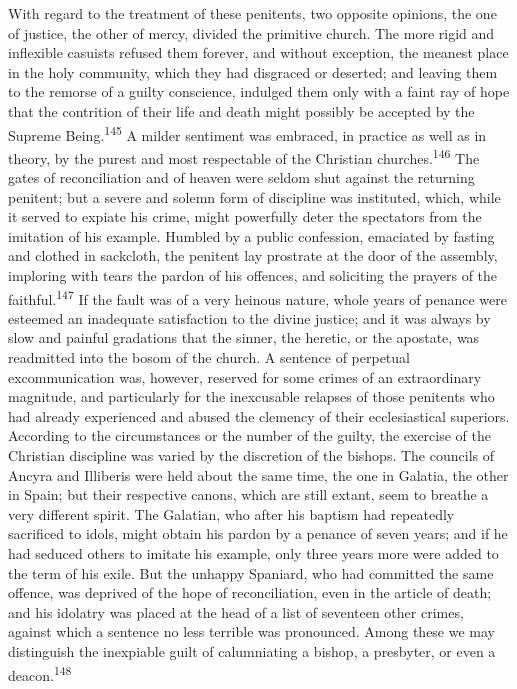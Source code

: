 With regard to the treatment of these penitents, two opposite
opinions, the one of justice, the other of mercy, divided the
primitive church. The more rigid and inflexible casuists refused
them forever, and without exception, the meanest place in the
holy community, which they had disgraced or deserted; and leaving
them to the remorse of a guilty conscience, indulged them only
with a faint ray of hope that the contrition of their life and
death might possibly be accepted by the Supreme Being.\textsuperscript{145} A
milder sentiment was embraced, in practice as well as in theory,
by the purest and most respectable of the Christian churches.\textsuperscript{146}
The gates of reconciliation and of heaven were seldom shut
against the returning penitent; but a severe and solemn form of
discipline was instituted, which, while it served to expiate his
crime, might powerfully deter the spectators from the imitation
of his example. Humbled by a public confession, emaciated by
fasting and clothed in sackcloth, the penitent lay prostrate at
the door of the assembly, imploring with tears the pardon of his
offences, and soliciting the prayers of the faithful.\textsuperscript{147} If the
fault was of a very heinous nature, whole years of penance were
esteemed an inadequate satisfaction to the divine justice; and it
was always by slow and painful gradations that the sinner, the
heretic, or the apostate, was readmitted into the bosom of the
church. A sentence of perpetual excommunication was, however,
reserved for some crimes of an extraordinary magnitude, and
particularly for the inexcusable relapses of those penitents who
had already experienced and abused the clemency of their
ecclesiastical superiors. According to the circumstances or the
number of the guilty, the exercise of the Christian discipline
was varied by the discretion of the bishops. The councils of
Ancyra and Illiberis were held about the same time, the one in
Galatia, the other in Spain; but their respective canons, which
are still extant, seem to breathe a very different spirit. The
Galatian, who after his baptism had repeatedly sacrificed to
idols, might obtain his pardon by a penance of seven years; and
if he had seduced others to imitate his example, only three years
more were added to the term of his exile. But the unhappy
Spaniard, who had committed the same offence, was deprived of the
hope of reconciliation, even in the article of death; and his
idolatry was placed at the head of a list of seventeen other
crimes, against which a sentence no less terrible was pronounced.
Among these we may distinguish the inexpiable guilt of
calumniating a bishop, a presbyter, or even a deacon.\textsuperscript{148}

